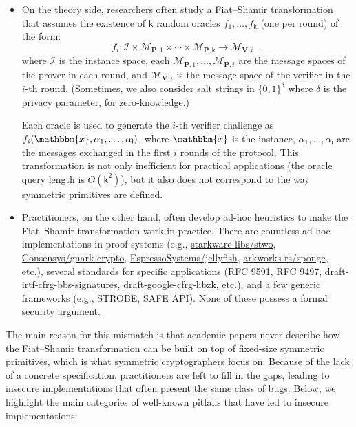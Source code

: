 \documentclass{article}
\begin{document}
\begin{itemize}
    \item On the theory side, researchers often study a Fiat--Shamir transformation that assumes the existence of $\mathsf{k}$ random oracles $f_1, \dots, f_{\mathsf{k}}$ (one per round) of the form:
\begin{equation*}
    f_i: \mathcal{I} \times \mathcal{M}_{\mathbf{P}, 1} \times \cdots \times \mathcal{M}_{\mathbf{P}, \mathsf{k}} \to \mathcal{M}_{\mathbf{V}, i}\enspace,
\end{equation*}
where \(\mathcal{I}\) is the instance space,  each \( \mathcal{M}_{\mathbf{P}, 1}, \dots, \mathcal{M}_{\mathbf{P}, i} \) are the message spaces of the prover in each round, and \( \mathcal{M}_{\mathbf{V}, i} \) is the message space of the verifier in the \(i\)-th round. (Sometimes, we also consider salt strings in \(\{0, 1\}^\delta\) where \(\delta\) is the privacy parameter, for zero-knowledge.)

Each oracle is used to generate the \(i\)-th verifier challenge as \(f_i(\mathbbm{x}, \alpha_1, \dots, \alpha_{\mathsf{i}})\), where \(\mathbbm{x}\) is the instance, \(\alpha_1, \dots, \alpha_{\mathsf{i}}\) are the messages exchanged in the first \(i\) rounds of the protocol.
This transformation is not only inefficient for practical applications (the oracle query length is $O(\mathsf{k}^2)$), but it also does not correspond to the way symmetric primitives are defined.

    \item Practitioners, on the other hand, often develop ad-hoc heuristics to make the Fiat--Shamir transformation work in practice. There are countless ad-hoc implementations in proof systems (e.g., \href{https://github.com/starkware-libs/stwo}{starkware-libs/stwo}, \href{https://github.com/Consensys/gnark-crypto}{Consensys/gnark-crypto}, \href{https://github.com/EspressoSystems/jellyfish}{EspressoSystems/jellyfish}, \href{https://github.com/arkworks-rs/sponge}{arkworks-rs/sponge}, etc.), several standards for specific applications (RFC 9591, RFC 9497, draft-irtf-cfrg-bbs-signatures, draft-google-cfrg-libzk, etc.), and a few generic frameworks (e.g., STROBE, SAFE API). None of these possess a formal security argument.
\end{itemize}

The main reason for this mismatch is that academic papers never describe how the Fiat--Shamir transformation can be built on top of fixed-size symmetric primitives, which is what symmetric cryptographers focus on. Because of the lack of a concrete specification, practitioners are left to fill in the gaps, leading to insecure implementations that often present the same class of bugs. Below, we highlight the main categories of well-known pitfalls that have led to insecure implementations:
\end{document}
